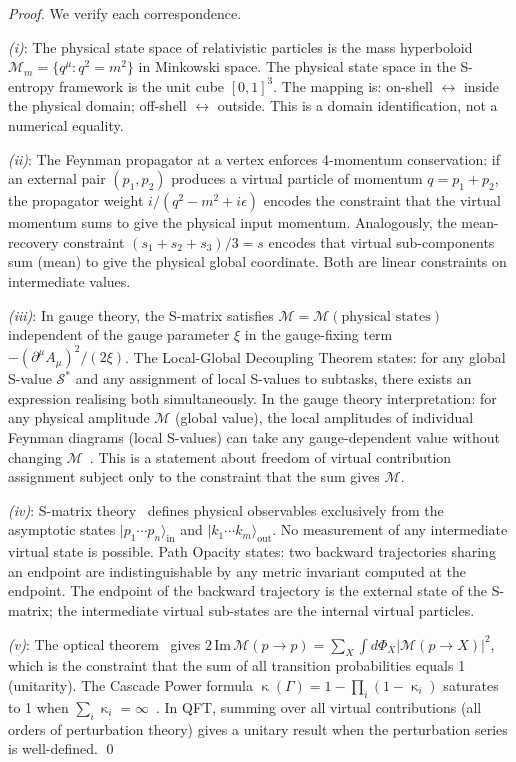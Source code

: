 \documentclass[twocolumn,10pt,a4paper]{article}
\theoremstyle{thmstyle}
\theoremstyle{definition}
\theoremstyle{remark}
\DeclareMathOperator{\catpow}{\kappa}
\begin{document}
\begin{proof}
We verify each correspondence.

\textit{(i)}: The physical state space of relativistic particles is
the mass hyperboloid $\mathcal{M}_m = \{q^\mu : q^2 = m^2\}$ in
Minkowski space. The physical state space in the S-entropy framework
is the unit cube $[0,1]^3$. The mapping is: on-shell $\leftrightarrow$
inside the physical domain; off-shell $\leftrightarrow$ outside. This
is a domain identification, not a numerical equality.

\textit{(ii)}: The Feynman propagator at a vertex enforces 4-momentum
conservation: if an external pair $(p_1, p_2)$ produces a virtual
particle of momentum $q = p_1 + p_2$, the propagator weight
$i/(q^2 - m^2 + i\epsilon)$ encodes the constraint that the virtual
momentum sums to give the physical input momentum. Analogously, the
mean-recovery constraint $(s_1+s_2+s_3)/3 = s$ encodes that virtual
sub-components sum (mean) to give the physical global coordinate. Both
are linear constraints on intermediate values.

\textit{(iii)}: In gauge theory, the S-matrix satisfies
$\mathcal{M} = \mathcal{M}(\text{physical states})$ independent of
the gauge parameter $\xi$ in the gauge-fixing term $-(\partial^\mu
A_\mu)^2/(2\xi)$. The Local-Global Decoupling Theorem states: for any
global S-value $\mathcal{S}^*$ and any assignment of local S-values to
subtasks, there exists an expression realising both simultaneously. In
the gauge theory interpretation: for any physical amplitude
$\mathcal{M}$ (global value), the local amplitudes of individual
Feynman diagrams (local S-values) can take any gauge-dependent value
without changing $\mathcal{M}$~\citep{peskin1995introduction}. This is a
statement about freedom of virtual contribution assignment subject
only to the constraint that the sum gives $\mathcal{M}$.

\textit{(iv)}: S-matrix theory~\citep{heisenberg1943smatrix,dyson1949smatrix}
defines physical observables exclusively from the asymptotic states
$|p_1 \cdots p_n\rangle_{\mathrm{in}}$ and $|k_1 \cdots k_m\rangle_
{\mathrm{out}}$. No measurement of any intermediate virtual state is
possible. Path Opacity states: two backward trajectories sharing an
endpoint are indistinguishable by any metric invariant computed at the
endpoint. The endpoint of the backward trajectory is the external state
of the S-matrix; the intermediate virtual sub-states are the internal
virtual particles.

\textit{(v)}: The optical theorem~\citep{cutkosky1960singularities}
gives $2\,\mathrm{Im}\,\mathcal{M}(p \to p) = \sum_X \int d\Phi_X
|\mathcal{M}(p \to X)|^2$, which is the constraint that the sum of
all transition probabilities equals 1 (unitarity). The Cascade Power
formula $\catpow(\Gamma) = 1 - \prod_i(1-\catpow_i)$ saturates to 1
when $\sum_i \catpow_i = \infty$~\citep{borel1909probabilites}. In
QFT, summing over all virtual contributions (all orders of perturbation
theory) gives a unitary result when the perturbation series is
well-defined. \qed
\end{proof}
\end{document}
